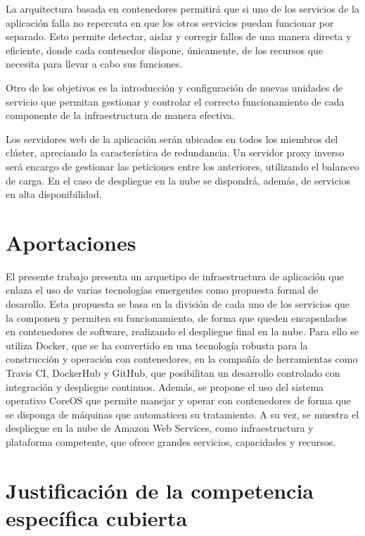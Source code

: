 La arquitectura basada en contenedores permitirá que si uno de los servicios de la aplicación falla no repercuta en que los otros servicios puedan funcionar por separado. Esto permite detectar, aislar y corregir fallos de una manera directa y eficiente, donde cada contenedor dispone, únicamente, de los recursos que necesita para llevar a cabo sus funciones.

Otro de los objetivos es la introducción y configuración de nuevas unidades de servicio que permitan gestionar y controlar el correcto funcionamiento de cada componente de la infraestructura de manera efectiva.

Los servidores web de la aplicación serán ubicados en todos los miembros del clúster, apreciando la característica de redundancia. Un servidor proxy inverso será encargo de gestionar las peticiones entre los anteriores, utilizando el balanceo de carga. En el caso de despliegue en la nube se dispondrá, además, de servicios en alta disponibilidad.

\section{Aportaciones}

El presente trabajo presenta un arquetipo de infraestructura de aplicación que enlaza el uso de varias tecnologías emergentes como propuesta formal de desarollo. Esta propuesta se basa en la división de cada uno de los servicios que la componen y permiten su funcionamiento, de forma que queden encapsulados en contenedores de software, realizando el despliegue final en la nube. Para ello se utiliza Docker, que se ha convertido en una tecnología robusta para la construcción y operación con contenedores, en la compañía de herramientas como Travis CI, DockerHub y GitHub, que posibilitan un desarrollo controlado con integración y despliegue continuos. Además, se propone el uso del sistema operativo CoreOS que permite manejar y operar con contenedores de forma que se disponga de máquinas que automaticen su tratamiento. A su vez, se muestra el despliegue en la nube de Amazon Web Services, como infraestructura y plataforma competente, que ofrece grandes servicios, capacidades y recursos.

\section{Justificación de la competencia específica cubierta}

